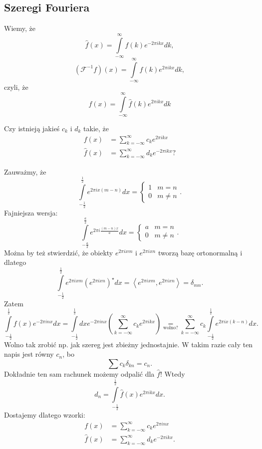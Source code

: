 \documentclass[../main.tex]{subfiles}
\begin{document}
\subsection{Szeregi Fouriera}
Wiemy, że
\[
    \hat{f}(x) = \int\limits_{-\infty}^{\infty} f(k) e^{-2\pi i k x}dk
,\]
\[
    \left( \mathcal{F}^{-1}f \right) (x) = \int\limits_{-\infty}^{\infty} f(k) e^{2\pi i k x}dk
,\]
czyli, że
\begin{equation}
    \label{eqn:eq27-3}
    f(x) = \int\limits_{-\infty}^{\infty} \hat{f}(k)e^{2\pi i k x}dk
\end{equation}
\begin{pytanie}
    Czy istnieją jakieś $c_k$ i $d_k$ takie, że
    \begin{align*}
        f(x) &= \sum_{k=-\infty}^{\infty} c_k e^{2\pi i kx}\\
        \hat{f}(x) &= \sum_{k=-\infty}^{\infty} d_k e^{-2\pi i k x}
    ?\end{align*}
\end{pytanie}
Zauważmy, że
\[
    \int\limits_{-\frac{1}{2}}^{\frac{1}{2}} e^{2\pi i x (m-n)}dx = \begin{cases}
        1 & m=n\\
        0  & m\neq n
    \end{cases}
.\]
Fajniejsza wersja:
\[
    \int\limits_{-\frac{a}{2}}^{\frac{a}{2}} e^{2\pi i \frac{(m-n)x}{a}}dx = \begin{cases}
        a & m = n\\
        0 & m \neq n
    \end{cases}
.\]
Można by też stwierdzić, że obiekty $e ^{2\pi i xm}$ i $e ^{2\pi i xn}$ tworzą bazę ortonormalną i dlatego
\[
    \int\limits_{-\frac{1}{2}}^{\frac{1}{2}} e^{2\pi i x m}\left(e^{2\pi i x n}\right)^\star dx = \left<e^{2\pi i xm}, e^{2\pi i xn} \right> = \delta_{mn}
.\]
Zatem
\[
    \int\limits_{-\frac{1}{2}}^{\frac{1}{2}} f(x) e^{-2\pi i n x}dx = \int\limits_{-\frac{1}{2}}^{\frac{1}{2}} dx e^{-2\pi i n x}\left( \sum_{k=-\infty}^{\infty} c_k e^{2\pi i k x} \right) \underset{\text{wolno?}}{=}  \sum_{k = -\infty}^{\infty} c_k \int\limits_{-\frac{1}{2}}^{\frac{1}{2}} e^{2\pi i x(k-n)}dx
.\]
Wolno tak zrobić np. jak szereg jest zbieżny jednostajnie. W takim razie cały ten napis jest równy $c_n$, bo
\[
    \sum c_k \delta_{kn} = c_n
.\]
Dokładnie ten sam rachunek możemy odpalić dla $\hat{f}$! Wtedy
\[
    d_n = \int\limits_{-\frac{1}{2}}^{\frac{1}{2}} \hat{f}(x) e^{2\pi i k x}dx
.\]
Dostajemy dlatego wzorki:
\begin{align}
    \label{eqn:eq27-4}
    f(x) &= \sum_{k=-\infty}^{\infty} c_k e^{2\pi i n x}\\
    \label{eqn:eq27-5}
    \hat{f}(x) &= \sum_{k=-\infty}^{\infty} d_k e^{-2\pi i k x}
.\end{align}
\end{document}
